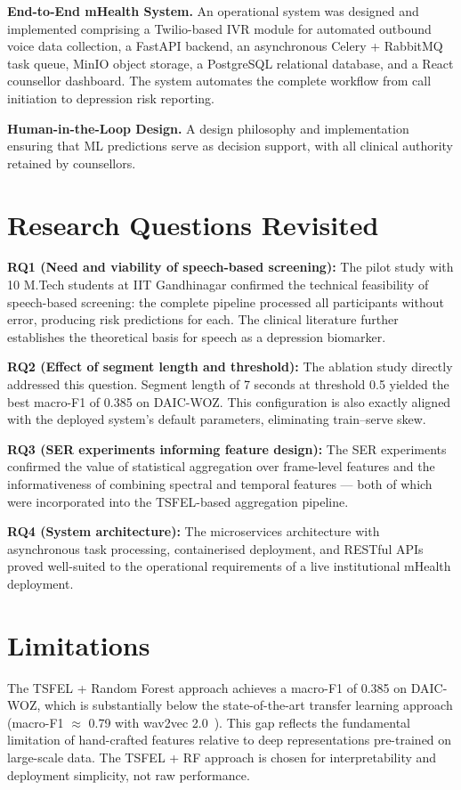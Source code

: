 \textbf{End-to-End mHealth System.} An operational system was designed and implemented comprising a Twilio-based IVR module for automated outbound voice data collection, a FastAPI backend, an asynchronous Celery + RabbitMQ task queue, MinIO object storage, a PostgreSQL relational database, and a React counsellor dashboard. The system automates the complete workflow from call initiation to depression risk reporting.

\textbf{Human-in-the-Loop Design.} A design philosophy and implementation ensuring that ML predictions serve as decision support, with all clinical authority retained by counsellors.

\section{Research Questions Revisited}

\textbf{RQ1 (Need and viability of speech-based screening):} The pilot study with 10 M.Tech students at IIT Gandhinagar confirmed the technical feasibility of speech-based screening: the complete pipeline processed all participants without error, producing risk predictions for each. The clinical literature further establishes the theoretical basis for speech as a depression biomarker.

\textbf{RQ2 (Effect of segment length and threshold):} The ablation study directly addressed this question. Segment length of 7 seconds at threshold 0.5 yielded the best macro-F1 of 0.385 on DAIC-WOZ. This configuration is also exactly aligned with the deployed system's default parameters, eliminating train–serve skew.

\textbf{RQ3 (SER experiments informing feature design):} The SER experiments confirmed the value of statistical aggregation over frame-level features and the informativeness of combining spectral and temporal features — both of which were incorporated into the TSFEL-based aggregation pipeline.

\textbf{RQ4 (System architecture):} The microservices architecture with asynchronous task processing, containerised deployment, and RESTful APIs proved well-suited to the operational requirements of a live institutional mHealth deployment.

\section{Limitations}

The TSFEL + Random Forest approach achieves a macro-F1 of 0.385 on DAIC-WOZ, which is substantially below the state-of-the-art transfer learning approach (macro-F1 $\approx$ 0.79 with wav2vec 2.0~\cite{Zhang2023}). This gap reflects the fundamental limitation of hand-crafted features relative to deep representations pre-trained on large-scale data. The TSFEL + RF approach is chosen for interpretability and deployment simplicity, not raw performance.

